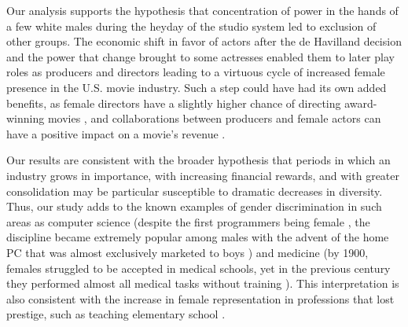 Our analysis supports the hypothesis that concentration of power in the hands of a few white males during the heyday of the studio system led to exclusion of other groups. The economic shift in favor of actors after the de Havilland decision \cite{DeHaviland1944} and the power that change brought to some actresses enabled them to later play roles as producers and directors leading to a virtuous cycle of increased female presence in the U.S. movie industry. Such a step could have had its own added benefits, as female directors have a slightly higher chance of directing award-winning movies \cite{Lutter2014}, and collaborations between producers and female actors can have a positive impact on a movie's revenue \cite{Narayan2016}.

Our results are consistent with the broader hypothesis that periods in which an industry grows in importance, with increasing financial rewards, and with greater consolidation may be particular susceptible to dramatic decreases in diversity. Thus, our study adds to the known examples of gender discrimination in such areas as computer science (despite the first programmers being female \cite{Sydell2014}, the discipline became extremely popular among males with the advent of the home PC that was almost exclusively marketed to boys \cite{Margolis2003}) and medicine (by 1900, females struggled to be accepted in medical schools, yet in the previous century they performed almost all medical tasks without training \cite{Morantz-Sanchez1985}). This interpretation is also consistent with the increase in female representation in professions that lost prestige, such as teaching elementary school \cite{Boyle2004}.
